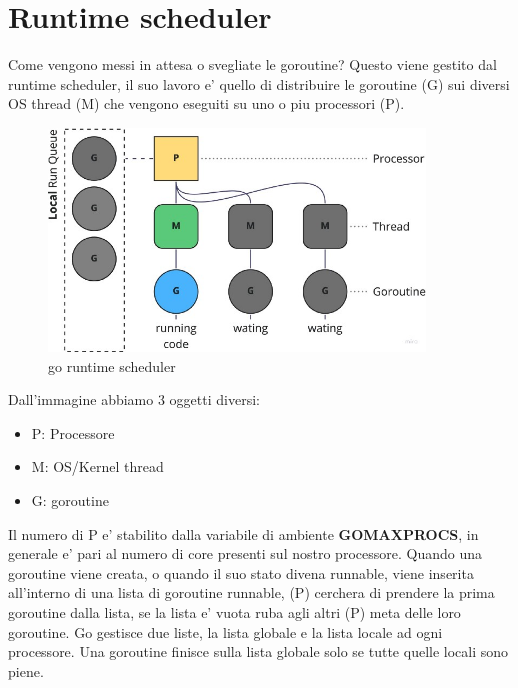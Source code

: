 \section{Runtime scheduler}
Come vengono messi in attesa o svegliate le goroutine? \newline Questo viene gestito dal runtime scheduler, il suo lavoro e' quello di distribuire le goroutine (G) sui diversi OS thread (M) che vengono eseguiti su uno o piu processori (P).

\begin{figure}[h!]
    \centering
    \includegraphics[width=10cm]{sections/runtime-go2.jpeg}
    \caption{go runtime scheduler}
    \label{fig:title}
\end{figure}

Dall'immagine abbiamo 3 oggetti diversi:

\begin{itemize}
    \item P: Processore
    \item M: OS/Kernel thread
    \item G: goroutine
\end{itemize}

Il numero di P e' stabilito dalla variabile di ambiente \textbf{GOMAXPROCS}, in generale e' pari al numero di core presenti sul nostro processore. \newline
Quando una goroutine viene creata, o quando il suo stato divena runnable, viene inserita all'interno di una lista di goroutine runnable, (P) cerchera di prendere la prima goroutine dalla lista, se la lista e' vuota ruba agli altri (P) meta delle loro goroutine. \newline
Go gestisce due liste, la lista globale e la lista locale ad ogni processore. Una goroutine finisce sulla lista globale solo se tutte quelle locali sono piene.

